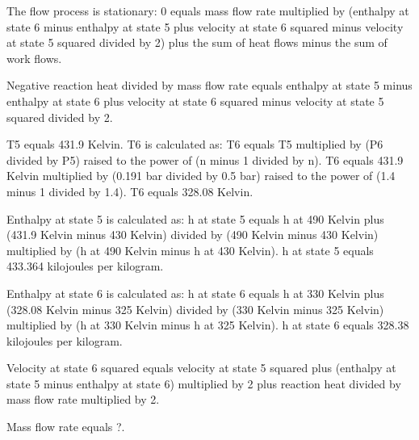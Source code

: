 The flow process is stationary:  
0 equals mass flow rate multiplied by (enthalpy at state 6 minus enthalpy at state 5 plus velocity at state 6 squared minus velocity at state 5 squared divided by 2) plus the sum of heat flows minus the sum of work flows.  

Negative reaction heat divided by mass flow rate equals enthalpy at state 5 minus enthalpy at state 6 plus velocity at state 6 squared minus velocity at state 5 squared divided by 2.  

T5 equals 431.9 Kelvin.  
T6 is calculated as:  
T6 equals T5 multiplied by (P6 divided by P5) raised to the power of (n minus 1 divided by n).  
T6 equals 431.9 Kelvin multiplied by (0.191 bar divided by 0.5 bar) raised to the power of (1.4 minus 1 divided by 1.4).  
T6 equals 328.08 Kelvin.  

Enthalpy at state 5 is calculated as:  
h at state 5 equals h at 490 Kelvin plus (431.9 Kelvin minus 430 Kelvin) divided by (490 Kelvin minus 430 Kelvin) multiplied by (h at 490 Kelvin minus h at 430 Kelvin).  
h at state 5 equals 433.364 kilojoules per kilogram.  

Enthalpy at state 6 is calculated as:  
h at state 6 equals h at 330 Kelvin plus (328.08 Kelvin minus 325 Kelvin) divided by (330 Kelvin minus 325 Kelvin) multiplied by (h at 330 Kelvin minus h at 325 Kelvin).  
h at state 6 equals 328.38 kilojoules per kilogram.  

Velocity at state 6 squared equals velocity at state 5 squared plus (enthalpy at state 5 minus enthalpy at state 6) multiplied by 2 plus reaction heat divided by mass flow rate multiplied by 2.  

Mass flow rate equals ?.